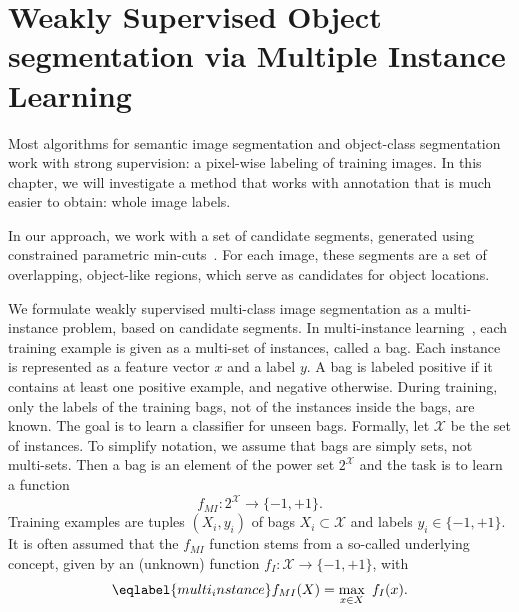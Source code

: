 \chapter{Weakly Supervised Object segmentation via Multiple Instance Learning}

Most algorithms for semantic image segmentation and object-class segmentation
work with strong supervision: a pixel-wise labeling of training images. In this
chapter, we will investigate a method that works with annotation that is much
easier to obtain: whole image labels.


In our approach, we work with a set of candidate segments, generated using constrained parametric min-cuts~\citep{carreira2010constrained}.
For each image, these segments are a set of overlapping, object-like regions, which serve
as candidates for object locations.

We formulate weakly supervised multi-class image segmentation as a multi-instance problem, based on candidate segments.
In multi-instance learning~\citep{dietterich1997solving}, each training example is given as a multi-set of instances, called a bag.
Each instance is represented as a feature vector $x$ and a label $y$.
A bag is labeled positive if it contains at least one positive example, and negative otherwise.
During training, only the labels of the training bags, not of the instances inside the bags, are known.
The goal is to learn a classifier for unseen bags. 
Formally, let $\mathcal{X}$ be the set of instances. To simplify notation, we assume that bags are simply sets, not multi-sets.
Then a bag is an element of the power set $2^\mathcal{X}$ and the task is
to learn a function
\begin{equation} f_{MI} \colon 2^\mathcal{X} \rightarrow \{-1,+1\}.  \end{equation}
Training examples are tuples $(X_i,y_i)$ of bags $X_i \subset \mathcal{X}$ and labels $y_i \in \{-1,+1\}$.
It is often assumed that the $f_{MI}$ function stems from a so-called underlying concept, given by an (unknown) function
$f_{I} \colon \mathcal{X} \rightarrow \{-1,+1\}$, with 
\begin{equation}\eqlabel{multi_instance}
f_{MI}(X)= \max_{x \in X}\ f_{I}(x).
\end{equation}

